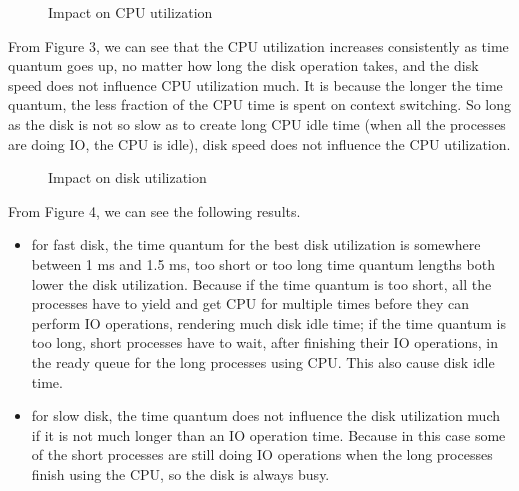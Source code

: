 \documentclass[12pt,letterpaper]{article}
\begin{document}
\begin{figure}[h]
\begin{center}
\caption{Impact on CPU utilization}
\end{center}
\end{figure}

From Figure 3, we can see that the CPU utilization increases consistently as time quantum goes up, no matter how long the disk operation takes, and the disk speed does not influence CPU utilization much. It is because the longer the time quantum, the less fraction of the CPU time is spent on context switching. So long as the disk is not so slow as to create long CPU idle time (when all the processes are doing IO, the CPU is idle), disk speed does not influence the CPU utilization.

\begin{figure}[h]
\begin{center}
\caption{Impact on disk utilization}
\end{center}
\end{figure}

From Figure 4, we can see the following results.

\begin{itemize}
\item for fast disk, the time quantum for the best disk utilization is somewhere between 1 ms and 1.5 ms, too short or too long time quantum lengths both lower the disk utilization. Because if the time quantum is too short, all the processes have to yield and get CPU for multiple times before they can perform IO operations, rendering much disk idle time; if the time quantum is too long, short processes have to wait, after finishing their IO operations, in the ready queue for the long processes using CPU. This also cause disk idle time.
\item for slow disk, the time quantum does not influence the disk utilization much if it is not much longer than an IO operation time. Because in this case some of the short processes are still doing IO operations when the long processes finish using the CPU, so the disk is always busy.
\end{itemize}
\end{document}
